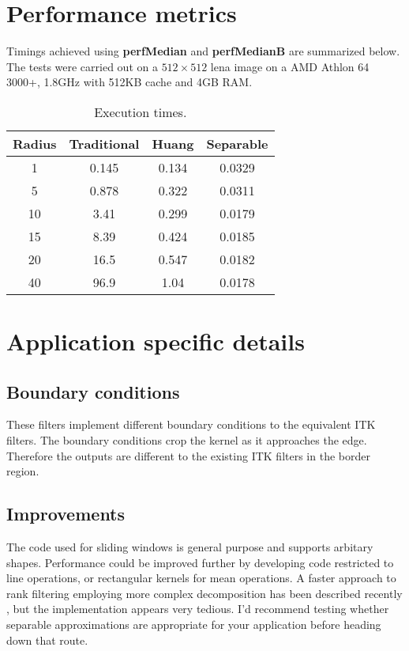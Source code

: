 \documentclass{InsightArticle}
\begin{document}
\section{Performance metrics}
Timings achieved using {\bf perfMedian} and {\bf perfMedianB} are
summarized below. The tests were carried out on a $512 \times 512$
lena image on a AMD Athlon 64 3000+, 1.8GHz with 512KB cache and 4GB RAM.

\begin{table}[htbp]
\centering
\begin{tabular}{|c|c|c|c|}
\hline
Radius & Traditional & Huang & Separable \\
\hline
\hline
1    &   0.145 &  0.134 &  0.0329 \\
5    &   0.878 &  0.322 &  0.0311 \\
10   &   3.41  &  0.299 &  0.0179 \\
15   &   8.39  &  0.424 &  0.0185 \\
20   &   16.5  &  0.547 &  0.0182 \\
40   &   96.9  &  1.04  &  0.0178 \\
\hline
\end{tabular}
\caption{Execution times. \label{tbl:perf}}
\end{table}

\section{Application specific details}
\subsection{Boundary conditions}
These filters implement different boundary conditions to the
equivalent ITK filters. The boundary conditions crop the kernel as it
approaches the edge. Therefore the outputs are different to the
existing ITK filters in the border region.

\subsection{Improvements}
The code used for sliding windows is general purpose and supports
arbitary shapes. Performance could be improved further by developing
code restricted to line operations, or rectangular kernels for mean
operations. A faster approach to rank filtering employing more complex
decomposition has been described recently \cite{Weiss}, but the
implementation appears very tedious. I'd recommend testing whether
separable approximations are appropriate for your application before
heading down that route.

\appendix





\nocite{ITKSoftwareGuide}
\end{document}
